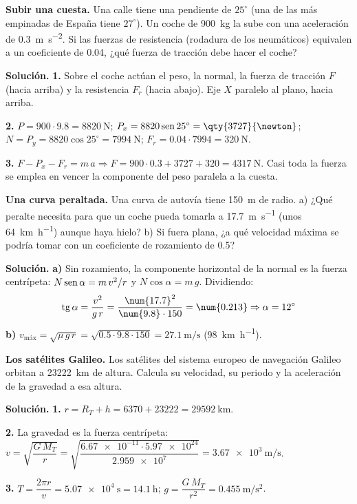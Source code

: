 \begin{example}
    \textbf{Subir una cuesta.} Una calle tiene una pendiente de \(25^\circ\) (una de las más empinadas de España tiene \(27^\circ\)). Un
    coche de \qty{900}{\kg} la sube con una aceleración de \qty{0.3}{\m\per\s\squared}. Si las fuerzas de resistencia (rodadura de los
    neumáticos) equivalen a un coeficiente de \num{0.04}, ¿qué fuerza de tracción debe hacer el coche?

    \textbf{Solución.} \textbf{1.} Sobre el coche actúan el peso, la normal, la fuerza de tracción \(F\) (hacia arriba) y la
    resistencia \(F_r\) (hacia abajo). Eje \(X\) paralelo al plano, hacia arriba.

    \textbf{2.} \(P = 900 \cdot \num{9.8} = \qty{8820}{\newton}\); \(P_x = 8820\sen 25^\circ = \qty{3727}{\newton}\);
    \(N = P_y = 8820\cos 25^\circ = \qty{7994}{\newton}\); \(F_r = \num{0.04} \cdot 7994 = \qty{320}{\newton}\).

    \textbf{3.} \(F - P_x - F_r = m\,a \Rightarrow F = 900 \cdot \num{0.3} + 3727 + 320 = \qty{4317}{\newton}\). Casi toda la fuerza
    se emplea en vencer la componente del peso paralela a la cuesta.
\end{example}

\begin{example}
    \textbf{Una curva peraltada.} Una curva de autovía tiene \qty{150}{\m} de radio. a) ¿Qué peralte necesita para que un coche pueda
    tomarla a \qty{17.7}{\m\per\s} (unos \qty{64}{\km\per\hour}) aunque haya hielo? b) Si fuera plana, ¿a qué velocidad máxima se
    podría tomar con un coeficiente de rozamiento de \num{0.5}?

    \textbf{Solución.} \textbf{a)} Sin rozamiento, la componente horizontal de la normal es la fuerza centrípeta:
    \(N\operatorname{sen}\alpha = m\,v^2/r\) y \(N\cos\alpha = m\,g\). Dividiendo:
    \[ \tg\alpha = \frac{v^2}{g\,r} = \frac{\num{17.7}^2}{\num{9.8} \cdot 150} = \num{0.213} \Rightarrow \alpha = 12^\circ \]
    \textbf{b)} \(v_{\text{máx}} = \sqrt{\mu\,g\,r} = \sqrt{\num{0.5} \cdot \num{9.8} \cdot 150} = \qty{27.1}{\m\per\s}\)
    (\qty{98}{\km\per\hour}).
\end{example}

\begin{example}
    \textbf{Los satélites Galileo.} Los satélites del sistema europeo de navegación Galileo orbitan a \qty{23222}{\km} de altura.
    Calcula su velocidad, su periodo y la aceleración de la gravedad a esa altura.

    \textbf{Solución.} \textbf{1.} \(r = R_T + h = 6370 + 23222 = \qty{29592}{\km}\).

    \textbf{2.} La gravedad es la fuerza centrípeta: \(v = \sqrt{\dfrac{G\,M_T}{r}} = \sqrt{\dfrac{\num{6.67e-11} \cdot \num{5.97e24}}{\num{2.959e7}}}
    = \qty{3.67e3}{\m\per\s}\).

    \textbf{3.} \(T = \dfrac{2\pi r}{v} = \qty{5.07e4}{\s} = \qty{14.1}{\hour}\); \(g = \dfrac{G\,M_T}{r^2} = \qty{0.455}{\m\per\s\squared}\).
\end{example}

